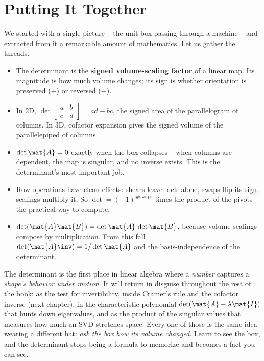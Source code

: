 \section{Putting It Together}
\label{ch21:together}

We started with a single picture -- the unit box passing through a machine -- and
extracted from it a remarkable amount of mathematics. Let us gather the threads.

\begin{itemize}
  \item The determinant is the \textbf{signed volume-scaling factor} of a linear
        map. Its magnitude is how much volume changes; its sign is whether
        orientation is preserved ($+$) or reversed ($-$).
  \item In $2$D, $\det\begin{bmatrix} a & b \\ c & d \end{bmatrix} = ad - bc$, the
        signed area of the parallelogram of columns. In $3$D, cofactor expansion
        gives the signed volume of the parallelepiped of columns.
  \item $\det\mat{A} = 0$ exactly when the box collapses -- when columns are
        dependent, the map is singular, and no inverse exists. This is the
        determinant's most important job.
  \item Row operations have clean effects: shears leave $\det$ alone, swaps flip
        its sign, scalings multiply it. So $\det = (-1)^{\#\text{swaps}}$ times the
        product of the pivots -- the practical way to compute.
  \item $\det(\mat{A}\mat{B}) = \det\mat{A}\,\det\mat{B}$, because volume scalings
        compose by multiplication. From this fall $\det(\mat{A}\inv) =
        1/\det\mat{A}$ and the basis-independence of the determinant.
\end{itemize}

\begin{aestheticbox}
The determinant is the first place in linear algebra where a \emph{number}
captures a \emph{shape's behavior under motion}. It will return in disguise
throughout the rest of the book: as the test for invertibility, inside Cramer's
rule and the cofactor inverse (next chapter), in the characteristic polynomial
$\det(\mat{A} - \lambda\mat{I})$ that hunts down eigenvalues, and as the product of
the singular values that measures how much an SVD stretches space. Every one of
those is the same idea wearing a different hat: \emph{ask the box how its volume
changed}. Learn to see the box, and the determinant stops being a formula to
memorize and becomes a fact you can see.
\end{aestheticbox}

